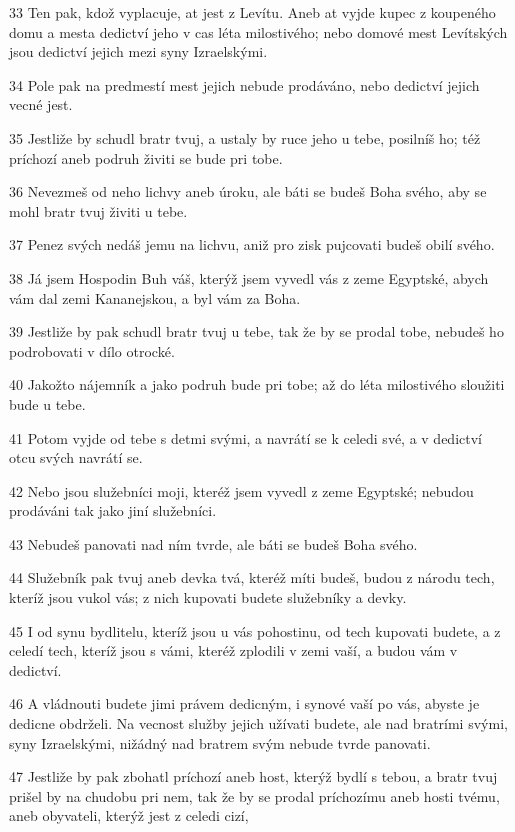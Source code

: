 \par 33 Ten pak, kdož vyplacuje, at jest z Levítu. Aneb at vyjde kupec z koupeného domu a mesta dedictví jeho v cas léta milostivého; nebo domové mest Levítských jsou dedictví jejich mezi syny Izraelskými.
\par 34 Pole pak na predmestí mest jejich nebude prodáváno, nebo dedictví jejich vecné jest.
\par 35 Jestliže by schudl bratr tvuj, a ustaly by ruce jeho u tebe, posilníš ho; též príchozí aneb podruh živiti se bude pri tobe.
\par 36 Nevezmeš od neho lichvy aneb úroku, ale báti se budeš Boha svého, aby se mohl bratr tvuj živiti u tebe.
\par 37 Penez svých nedáš jemu na lichvu, aniž pro zisk pujcovati budeš obilí svého.
\par 38 Já jsem Hospodin Buh váš, kterýž jsem vyvedl vás z zeme Egyptské, abych vám dal zemi Kananejskou, a byl vám za Boha.
\par 39 Jestliže by pak schudl bratr tvuj u tebe, tak že by se prodal tobe, nebudeš ho podrobovati v dílo otrocké.
\par 40 Jakožto nájemník a jako podruh bude pri tobe; až do léta milostivého sloužiti bude u tebe.
\par 41 Potom vyjde od tebe s detmi svými, a navrátí se k celedi své, a v dedictví otcu svých navrátí se.
\par 42 Nebo jsou služebníci moji, kteréž jsem vyvedl z zeme Egyptské; nebudou prodáváni tak jako jiní služebníci.
\par 43 Nebudeš panovati nad ním tvrde, ale báti se budeš Boha svého.
\par 44 Služebník pak tvuj aneb devka tvá, kteréž míti budeš, budou z národu tech, kteríž jsou vukol vás; z nich kupovati budete služebníky a devky.
\par 45 I od synu bydlitelu, kteríž jsou u vás pohostinu, od tech kupovati budete, a z celedí tech, kteríž jsou s vámi, kteréž zplodili v zemi vaší, a budou vám v dedictví.
\par 46 A vládnouti budete jimi právem dedicným, i synové vaší po vás, abyste je dedicne obdrželi. Na vecnost služby jejich užívati budete, ale nad bratrími svými, syny Izraelskými, nižádný nad bratrem svým nebude tvrde panovati.
\par 47 Jestliže by pak zbohatl príchozí aneb host, kterýž bydlí s tebou, a bratr tvuj prišel by na chudobu pri nem, tak že by se prodal príchozímu aneb hosti tvému, aneb obyvateli, kterýž jest z celedi cizí,

